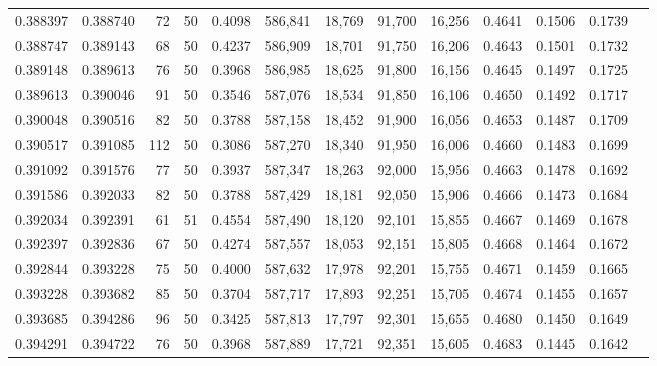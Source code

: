 \begin{tabular}{rrrrrrrrrrrrr}
0.388397 & 0.388740 &    72 &  50 &                                     0.4098 & 586,841 &  18,769 &  91,700 &  16,256 & 0.4641 & 0.1506 & 0.1739 \\
0.388747 & 0.389143 &    68 &  50 &                                     0.4237 & 586,909 &  18,701 &  91,750 &  16,206 & 0.4643 & 0.1501 & 0.1732 \\
0.389148 & 0.389613 &    76 &  50 &                                     0.3968 & 586,985 &  18,625 &  91,800 &  16,156 & 0.4645 & 0.1497 & 0.1725 \\
0.389613 & 0.390046 &    91 &  50 &                                     0.3546 & 587,076 &  18,534 &  91,850 &  16,106 & 0.4650 & 0.1492 & 0.1717 \\
0.390048 & 0.390516 &    82 &  50 &                                     0.3788 & 587,158 &  18,452 &  91,900 &  16,056 & 0.4653 & 0.1487 & 0.1709 \\
0.390517 & 0.391085 &   112 &  50 &                                     0.3086 & 587,270 &  18,340 &  91,950 &  16,006 & 0.4660 & 0.1483 & 0.1699 \\
0.391092 & 0.391576 &    77 &  50 &                                     0.3937 & 587,347 &  18,263 &  92,000 &  15,956 & 0.4663 & 0.1478 & 0.1692 \\
0.391586 & 0.392033 &    82 &  50 &                                     0.3788 & 587,429 &  18,181 &  92,050 &  15,906 & 0.4666 & 0.1473 & 0.1684 \\
0.392034 & 0.392391 &    61 &  51 &                                     0.4554 & 587,490 &  18,120 &  92,101 &  15,855 & 0.4667 & 0.1469 & 0.1678 \\
0.392397 & 0.392836 &    67 &  50 &                                     0.4274 & 587,557 &  18,053 &  92,151 &  15,805 & 0.4668 & 0.1464 & 0.1672 \\
0.392844 & 0.393228 &    75 &  50 &                                     0.4000 & 587,632 &  17,978 &  92,201 &  15,755 & 0.4671 & 0.1459 & 0.1665 \\
0.393228 & 0.393682 &    85 &  50 &                                     0.3704 & 587,717 &  17,893 &  92,251 &  15,705 & 0.4674 & 0.1455 & 0.1657 \\
0.393685 & 0.394286 &    96 &  50 &                                     0.3425 & 587,813 &  17,797 &  92,301 &  15,655 & 0.4680 & 0.1450 & 0.1649 \\
0.394291 & 0.394722 &    76 &  50 &                                     0.3968 & 587,889 &  17,721 &  92,351 &  15,605 & 0.4683 & 0.1445 & 0.1642 \\

\end{tabular}
